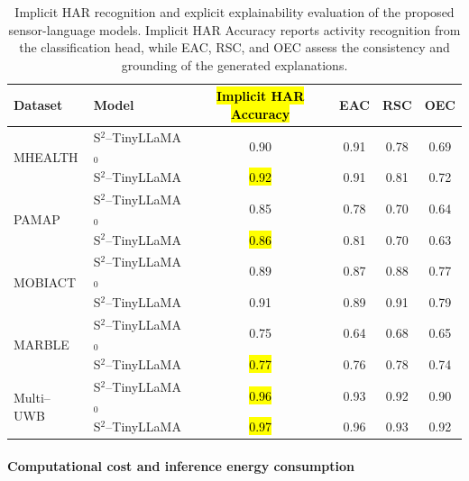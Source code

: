 \documentclass[preprint,12pt]{elsarticle}
\begin{document}
\begin{table}[t]
\centering
\caption{Implicit HAR recognition and explicit explainability evaluation of the proposed sensor-language models. Implicit HAR Accuracy reports activity recognition from the classification head, while EAC, RSC, and OEC assess the consistency and grounding of the generated explanations.}
\label{tab:explicit_explainability}

\scriptsize
\setlength{\tabcolsep}{5pt}
\renewcommand{\arraystretch}{1.05}

\begin{tabular}{l l c c c c}
\hline
Dataset & Model & \hl{Implicit HAR Accuracy} & EAC & RSC & OEC \\
\hline

\multirow{2}{*}{MHEALTH}
& S$^{2}$--TinyLLaMA$_0$ & 0.90 & 0.91 & 0.78 & 0.69 \\
& S$^{2}$--TinyLLaMA & \hl{0.92} & 0.91 & 0.81 & 0.72 \\
\hline

\multirow{2}{*}{PAMAP}
& S$^{2}$--TinyLLaMA$_0$ & 0.85 & 0.78 & 0.70 & 0.64 \\
& S$^{2}$--TinyLLaMA & \hl{0.86} & 0.81 & 0.70 & 0.63 \\
\hline

\multirow{2}{*}{MOBIACT}
& S$^{2}$--TinyLLaMA$_0$ & 0.89 & 0.87 & 0.88 & 0.77 \\
& S$^{2}$--TinyLLaMA & 0.91 & 0.89 & 0.91 & 0.79 \\
\hline

\multirow{2}{*}{MARBLE}
& S$^{2}$--TinyLLaMA$_0$ & 0.75 & 0.64 & 0.68 & 0.65 \\
& S$^{2}$--TinyLLaMA & \hl{0.77} & 0.76 & 0.78 & 0.74 \\
\hline

\multirow{2}{*}{Multi--UWB}
& S$^{2}$--TinyLLaMA$_0$ & \hl{0.96} & 0.93 & 0.92 & 0.90 \\
& S$^{2}$--TinyLLaMA & \hl{0.97} & 0.96 & 0.93 & 0.92 \\
\hline

\end{tabular}
\end{table}




\paragraph{Computational cost and inference energy consumption}
\end{document}

